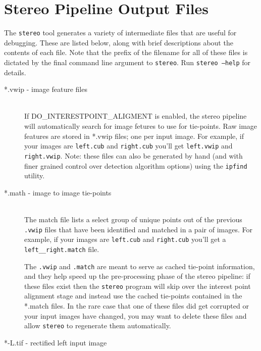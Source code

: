 \chapter{Stereo Pipeline Output Files}
\label{chapter:outputfiles}

The {\tt stereo} tool generates a variety of intermediate files that
are useful for debugging.  These are listed below, along with brief
descriptions about the contents of each file.  Note that the prefix of
the filename for all of these files is dictated by the final command
line argument to {\tt stereo}.  Run {\tt stereo --help} for details.

\begin{description}

\item[*.vwip - image feature files] \hfill \\ 

  If DO\_INTERESTPOINT\_ALIGMENT is enabled, the stereo pipeline will
  automatically search for image fetures to use for tie-points.  Raw
  image features are stored in *.vwip files; one per input image. For
  example, if your images are \texttt{left.cub} and \texttt{right.cub}
  you'll get \texttt{left.vwip} and \texttt{right.vwip}.  Note: these
  files can also be generated by hand (and with finer grained control
  over detection algorithm options) using the {\tt ipfind} utility.

\item[*.math - image to image tie-points] \hfill \\ 

  The match file lists a select group of unique points out of the
  previous \texttt{.vwip} files that have been identified and matched
  in a pair of images.  For example, if your images are
  \texttt{left.cub} and \texttt{right.cub} you'll get a
  \texttt{left\_\_right.match} file.  

  The \texttt{.vwip} and \texttt{.match} are meant to serve as cached
  tie-point information, and they help speed up the pre-processing
  phase of the stereo pipeline: if these files exist then the
  \texttt{stereo} program will skip over the interest point alignment
  stage and instead use the cached tie-points contained in the *.match
  files.  In the rare case that one of these files did get corrupted
  or your input images have changed, you may want to delete these
  files and allow {\tt stereo} to regenerate them automatically.

\item[*-L.tif - rectified left input image] \hfill \\ 


\end{description}

